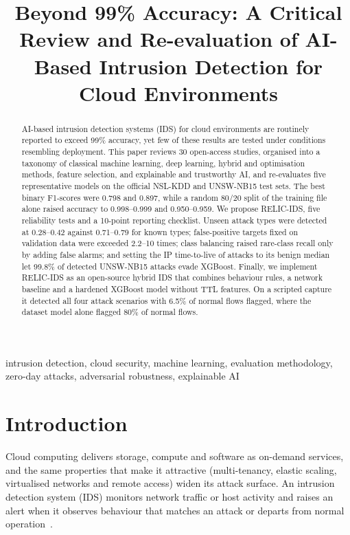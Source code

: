 \documentclass[conference]{IEEEtran}
\begin{document}
\title{Beyond 99\% Accuracy: A Critical Review and Re-evaluation of AI-Based Intrusion Detection for Cloud Environments}

\author{
}

\maketitle

\begin{abstract}
AI-based intrusion detection systems (IDS) for cloud environments are routinely reported to exceed 99\% accuracy, yet few of these results are tested under conditions resembling deployment. This paper reviews 30 open-access studies, organised into a taxonomy of classical machine learning, deep learning, hybrid and optimisation methods, feature selection, and explainable and trustworthy AI, and re-evaluates five representative models on the official NSL-KDD and UNSW-NB15 test sets. The best binary F1-scores were 0.798 and 0.897, while a random 80/20 split of the training file alone raised accuracy to 0.998--0.999 and 0.950--0.959. We propose RELIC-IDS, five reliability tests and a 10-point reporting checklist. Unseen attack types were detected at 0.28--0.42 against 0.71--0.79 for known types; false-positive targets fixed on validation data were exceeded 2.2--10 times; class balancing raised rare-class recall only by adding false alarms; and setting the IP time-to-live of attacks to its benign median let 99.8\% of detected UNSW-NB15 attacks evade XGBoost. Finally, we implement RELIC-IDS as an open-source hybrid IDS that combines behaviour rules, a network baseline and a hardened XGBoost model without TTL features. On a scripted capture it detected all four attack scenarios with 6.5\% of normal flows flagged, where the dataset model alone flagged 80\% of normal flows.
\end{abstract}

\begin{IEEEkeywords}
intrusion detection, cloud security, machine learning, evaluation methodology, zero-day attacks, adversarial robustness, explainable AI
\end{IEEEkeywords}

\section{Introduction}
Cloud computing delivers storage, compute and software as on-demand services, and the same properties that make it attractive (multi-tenancy, elastic scaling, virtualised networks and remote access) widen its attack surface. An intrusion detection system (IDS) monitors network traffic or host activity and raises an alert when it observes behaviour that matches an attack or departs from normal operation~\cite{khraisat2019}.
\end{document}
